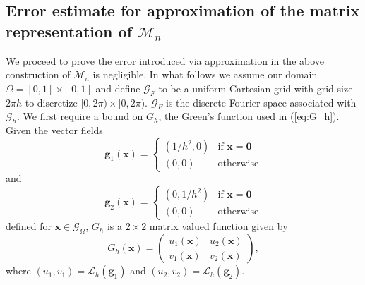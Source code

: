 \documentclass[preprint,12pt]{elsarticle}
\begin{document}
\subsection{Error estimate for approximation of the matrix representation of $\mathcal{M}_n$}
We proceed to prove the error introduced via approximation in the above construction of $\mathcal{M}_n$ is negligible. In what follows we assume our domain $\Omega = [0,1]\times[0,1]$ and define $\mathcal{G}_F$ to be a uniform Cartesian grid with grid size $2\pi h$ to discretize $[0,2\pi)\times[0,2\pi)$. $\mathcal{G}_F$ is the discrete Fourier space associated with $\mathcal{G}_h$.
We first require a bound on $G_h$, the Green's function used in (\ref{eq:G_h}). Given the vector fields
\begin{equation}
\mathbf{g}_1(\mathbf{x}) = \begin{cases}
(1/h^2,0)& \textrm{if } \mathbf{x} = \mathbf{0} \\
(0,0)& \textrm{otherwise}
\end{cases}
\end{equation}
and
\begin{equation}
\mathbf{g}_2(\mathbf{x}) = \begin{cases}
(0,1/h^2)& \textrm{if } \mathbf{x} = \mathbf{0} \\
(0,0)& \textrm{otherwise}
\end{cases}
\end{equation}
defined for $\mathbf{x} \in \mathcal{G}_\Omega$, 
$G_h$ is a $2\times 2$ matrix valued function given by
\begin{equation}
G_h(\mathbf{x})=
\left( \begin{array}{cc}
u_1(\mathbf{x}) & u_2(\mathbf{x}) \\
v_1(\mathbf{x}) & v_2(\mathbf{x})
\end{array} \right),
\end{equation}
where $(u_1,v_1) = \mathcal{L}_h(\mathbf{g}_1)$ and $(u_2,v_2) = \mathcal{L}_h(\mathbf{g}_2)$.
\end{document}
